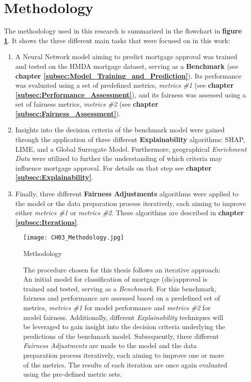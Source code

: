 \section{Methodology}\label{sec:Methodology}

The methodology used in this research is summarized in the flowchart in \textbf{figure \ref{fig:CH03_Methodology}}. It shows the three different main tasks that were focused on in this work:

\begin{enumerate}
    \item A Neural Network model aiming to predict mortgage approval was trained and tested on the HMDA mortgage dataset, serving as a \textbf{Benchmark} (see \textbf{chapter \ref{subsec:Model_Training_and_Prediction}}). Its performance was evaluated using a set of predefined metrics, \textit{metrics \#1} (see \textbf{chapter \ref{subsec:Performance_Assessment}}), and its fairness was assessed using a set of fairness metrics, \textit{metrics \#2} (see \textbf{chapter \ref{subsec:Fairness_Assessment}}). 
    \item Insights into the decision criteria of the benchmark model were gained through the application of three different \textbf{Explainability} algorithms: SHAP, LIME, and a Global Surrogate Model. Furthermore, geographical \textit{Enrichment Data} were utilized to further the understanding of which criteria may influence mortgage approval. For details on that step see \textbf{chapter \ref{subsec:Explainability}}.
    \item Finally, three different \textbf{Fairness Adjustments} algorithms were applied to the model or the data preparation process iteratively, each aiming to improve either \textit{metrics \#1} or \textit{metrics \#2}. These algorithms are described in \textbf{chapter \ref{subsec:Iterations}}.
\end{enumerate}

\begin{figure}[h]
    \centering
    \texttt{[image: CH03\_Methodology.jpg]}
    \caption{Methodology}
    \caption*{The procedure chosen for this thesis follows an iterative approach: An initial model for classification of mortgage (dis)approval is trained and tested, serving as a \textit{Benchmark}. 
    For this benchmark, fairness and performance are assessed based on a predefined set of metrics, \textit{metrics \#1} for model performance and \textit{metrics \#2} for model fairness. 
    Additionally, different \textit{Explainability} techniques will be leveraged to gain insight into the decision criteria underlying the predictions of the benchmark model. 
    Subsequently, three different \textit{Fairness Adjustments} are made to the model and the data preparation process iteratively, each aiming to improve one or more of the metrics. 
    The results of each iteration are once again evaluated using the pre-defined metric sets.}
    \label{fig:CH03_Methodology}
\end{figure}

